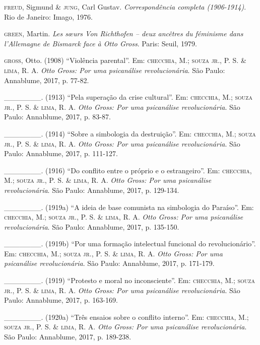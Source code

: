 \begin{Parskip}
\textsc{freud}, Sigmund \& \textsc{jung}, Carl Gustav. \emph{Correspondência completa (1906-1914)}. Rio de Janeiro: Imago, 1976.

\textsc{green}, Martin. \emph{Les s\oe urs Von Richthofen -- deux ancêtres du féminisme dans l'Allemagne de Bismarck face à Otto Gross}. Paris: Seuil, 1979.

\textsc{gross}, Otto. (1908) ``Violência parental''. Em: \textsc{checchia}, M.; \textsc{souza jr.}, P. S. \& \textsc{lima}, R. A. \emph{Otto Gross: Por uma psicanálise revolucionária}. São Paulo: Annablume, 2017, p. 77-82.

\_\_\_\_\_\_\_. (1913) ``Pela superação da crise cultural''. Em: \textsc{checchia}, M.; \textsc{souza jr.}, P. S. \& \textsc{lima}, R. A. \emph{Otto Gross: Por uma psicanálise revolucionária}. São Paulo: Annablume, 2017, p. 83-87.

\_\_\_\_\_\_\_. (1914) ``Sobre a simbologia da destruição''. Em: \textsc{checchia}, M.; \textsc{souza jr.}, P. S. \& \textsc{lima}, R. A. \emph{Otto Gross: Por uma psicanálise revolucionária}. São Paulo: Annablume, 2017, p. 111-127.

\_\_\_\_\_\_\_. (1916) ``Do conflito entre o próprio e o estrangeiro''. Em: \textsc{checchia}, M.; \textsc{souza jr.}, P. S. \& \textsc{lima}, R. A. \emph{Otto Gross: Por uma psicanálise revolucionária}. São Paulo: Annablume, 2017, p. 129-134.

\_\_\_\_\_\_\_. (1919a) ``A ideia de base comunista na simbologia do Paraíso''. Em: \textsc{checchia}, M.; \textsc{souza jr.}, P. S. \& \textsc{lima}, R. A. \emph{Otto Gross: Por uma psicanálise revolucionária}. São Paulo: Annablume, 2017, p. 135-150.

\_\_\_\_\_\_\_. (1919b) ``Por uma formação intelectual funcional do revolucionário''. Em: \textsc{checchia}, M.; \textsc{souza jr.}, P. S. \& \textsc{lima}, R. A. \emph{Otto Gross: Por uma psicanálise revolucionária}. São Paulo: Annablume, 2017, p. 171-179.

\_\_\_\_\_\_\_. (1919) ``Protesto e moral no inconsciente''. Em: \textsc{checchia}, M.; \textsc{souza jr.}, P. S. \& \textsc{lima}, R. A. \emph{Otto Gross: Por uma psicanálise revolucionária}. São Paulo: Annablume, 2017, p. 163-169.

\_\_\_\_\_\_\_. (1920a) ``Três ensaios sobre o conflito interno''. Em: \textsc{checchia}, M.; \textsc{souza jr.}, P. S. \& \textsc{lima}, R. A. \emph{Otto Gross: Por uma psicanálise revolucionária}. São Paulo: Annablume, 2017, p. 189-238.


\end{Parskip}
